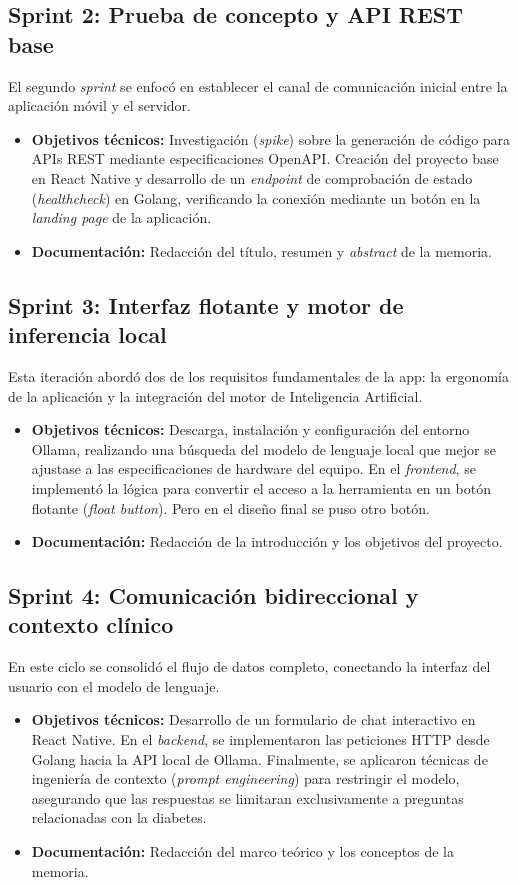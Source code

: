 \subsection*{Sprint 2: Prueba de concepto y API REST base}
El segundo \textit{sprint} se enfocó en establecer el canal de comunicación inicial entre la aplicación móvil y el servidor.
\begin{itemize}
    \item \textbf{Objetivos técnicos:} Investigación (\textit{spike}) sobre la generación de código para APIs REST mediante especificaciones OpenAPI. Creación del proyecto base en React Native y desarrollo de un \textit{endpoint} de comprobación de estado (\textit{healthcheck}) en Golang, verificando la conexión mediante un botón en la \textit{landing page} de la aplicación.
    \item \textbf{Documentación:} Redacción del título, resumen y \textit{abstract} de la memoria.
\end{itemize}

\subsection*{Sprint 3: Interfaz flotante y motor de inferencia local}
Esta iteración abordó dos de los requisitos fundamentales de la app: la ergonomía de la aplicación y la integración del motor de Inteligencia Artificial.
\begin{itemize}
    \item \textbf{Objetivos técnicos:} Descarga, instalación y configuración del entorno Ollama, realizando una búsqueda del modelo de lenguaje local que mejor se ajustase a las especificaciones de hardware del equipo. En el \textit{frontend}, se implementó la lógica para convertir el acceso a la herramienta en un botón flotante (\textit{float button}). Pero en el diseño final se puso otro botón.
    \item \textbf{Documentación:} Redacción de la introducción y los objetivos del proyecto.
\end{itemize}

\subsection*{Sprint 4: Comunicación bidireccional y contexto clínico}
En este ciclo se consolidó el flujo de datos completo, conectando la interfaz del usuario con el modelo de lenguaje.
\begin{itemize}
    \item \textbf{Objetivos técnicos:} Desarrollo de un formulario de chat interactivo en React Native. En el \textit{backend}, se implementaron las peticiones HTTP desde Golang hacia la API local de Ollama. Finalmente, se aplicaron técnicas de ingeniería de contexto (\textit{prompt engineering}) para restringir el modelo, asegurando que las respuestas se limitaran exclusivamente a preguntas relacionadas con la diabetes.
    \item \textbf{Documentación:} Redacción del marco teórico y los conceptos de la memoria.
\end{itemize}

